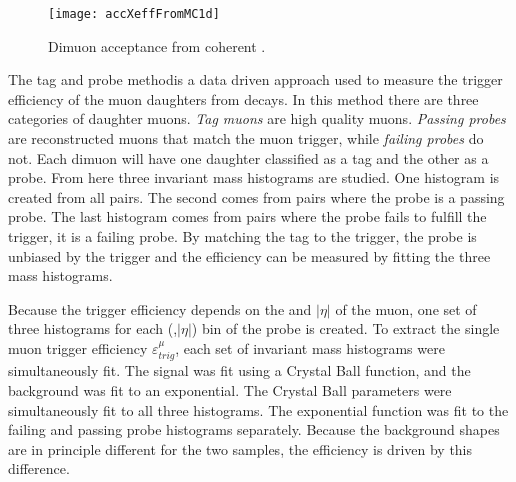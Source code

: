 \DIFdelend \DIFaddbegin \begin{figure}[!Hhtb]
          \DIFaddendFL \centering
            \DIFdelbeginFL {}\DIFdelendFL \DIFaddbeginFL \texttt{[image: accXeffFromMC1d]}
          \DIFaddendFL \caption{Dimuon acceptance from coherent \JPsi{}\DIFdelbeginFL {}\DIFdelendFL .}
          \label{fig:jpsiAcceptance}
        \DIFdelbeginFL %
\DIFdelendFL \DIFaddbeginFL \end{figure}
\DIFaddend 

      The \DIFdelbegin {}\DIFdelend \DIFaddbegin {}\DIFaddend tag and probe method\DIFdelbegin {}\DIFdelend \DIFaddbegin {}\DIFaddend is a data driven approach used to measure the 
        trigger efficiency of the muon daughters from \JPsi{} decays.
      In this method there are three categories of daughter muons. 
      \textit{Tag muons} are high quality muons.
      \textit{Passing probes} are reconstructed muons that match the muon 
        trigger, while \textit{failing probes} do not. 
      Each dimuon will have one daughter classified as a tag and the other
        as a probe.
      From here three invariant mass histograms are studied. 
      One histogram is created from all pairs. 
      The second comes from pairs where the probe is a passing probe.  
      The last histogram comes from pairs where the probe fails to fulfill
        the trigger, it is a failing probe. 
      By matching the tag to the trigger, the probe is unbiased by the trigger 
        and the  efficiency can be measured by fitting the three mass 
        histograms. 

      Because the trigger efficiency depends on the \pt{} and $|\eta|$ of the 
        muon, one set of three histograms for each (\pt{},$|\eta|$) bin of the
        probe is created.
      To extract the single muon trigger efficiency $\varepsilon^{\mu}_{trig}$, 
        each set of invariant mass histograms were simultaneously fit. 
      The signal was fit using a Crystal Ball function, and the background 
        was fit to an exponential.
      The Crystal Ball parameters were simultaneously fit to all three 
        histograms.
      The exponential function was fit to the failing and passing probe 
        histograms separately.
      Because the background shapes are in principle different for the two 
        samples, the efficiency is driven by this difference. 

